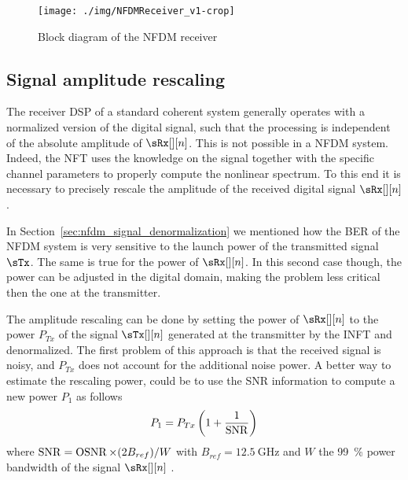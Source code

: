 \begin{figure}[t]
  \centering
  \texttt{[image: ./img/NFDMReceiver\_v1-crop]}
  \caption{Block diagram of the \ac{NFDM} receiver}
  \label{fig:nfdm_receiver}
\end{figure}


\subsection{Signal amplitude rescaling}\label{sec:nfdm_power_rescaling}

The receiver \ac{DSP} of a standard coherent system generally operates with a normalized version of the digital signal, such that the  processing is independent of the absolute amplitude of $\sdRx$. This is not possible in a \ac{NFDM} system. Indeed, the \ac{NFT}
uses the knowledge on the signal together with the specific channel parameters to properly compute the nonlinear spectrum. To this end it is necessary to precisely rescale the amplitude of the received digital signal $\sdRx$.

In Section~\ref{sec:nfdm_signal_denormalization} we mentioned how the \ac{BER} of the \ac{NFDM} system is very sensitive to the launch power of the transmitted signal $\sTx$. The same is true for the power of $\sdRx$. In this second case though, the power can be adjusted in the digital domain, making the problem less critical then the one at the transmitter.

The amplitude rescaling can be done by setting the power of $\sdRx$ to the power
$P_{Tx}$ of the signal $\sdTx$ generated at the transmitter by the \ac{INFT} and denormalized.
The first problem of this approach is that the received signal is noisy, and $P_{Tx}$ does not account for the additional noise power.
A better way to estimate the rescaling power, could be to use the \ac{SNR} information to compute a new power $P_1$ as follows
\begin{equation}\label{eq:P1_rescaling}
 P_1 = P_{Tx}\left(1 + \dfrac{1}{\operatorname*{SNR}}\right)
\end{equation}
where $\operatorname*{SNR} = \operatorname*{OSNR} \times (2 B_{ref}) / W$ with $B_{ref} = \SI{12.5}{\GHz}$ and $W$ the 99~\% power bandwidth of the signal $\sdRx$ \cite{Essiambre}.


